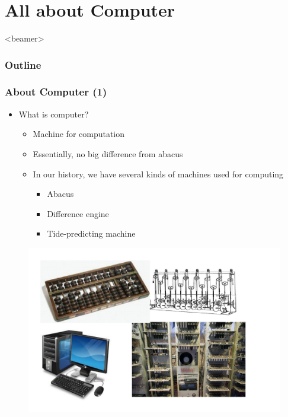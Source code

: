 \section{All about Computer}
\label{sec:computer}
\begin{frame}<beamer>
    \frametitle{Outline}
    \tableofcontents[currentsection]
\end{frame}

\begin{frame}
\frametitle{About Computer (1)}
\begin{itemize}
	\item {What is computer?}
	\begin{itemize}
		\item {Machine for computation}
		\item {Essentially, no big difference from abacus}
		\item {In our history, we have several kinds of machines used for computing}
		\begin{itemize}
			\item {Abacus}
			\item {Difference engine}
			\item {Tide-predicting machine}
		\end{itemize}
	\end{itemize}
\end{itemize}
\begin{figure}
	\includegraphics[width=0.5\linewidth]{figs/history_pcs.pdf}
\end{figure}
\end{frame}

